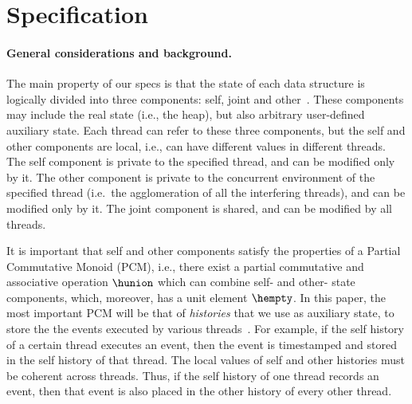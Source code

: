 \section{Specification}
\label{sc:formal}


\def\histx{\hist_\x}
\def\histy{\hist_\y}
\def\histp{\hist_p}

\newcommand{\sx}{S_\x}
\newcommand{\sy}{S_\y}
\newcommand{\spp}{S_p}
\newcommand{\sss}{S_s}
\newcommand{\wx}{W_\x}
\newcommand{\wy}{W_\y}
\newcommand{\wpp}{W_p}


\def\toff{t_{\mathsf{off}}}




\paragraph*{General considerations and background.}
%
The main property of our specs is that the state of each data
structure is logically divided into three components: self, joint and
other~\cite{LeyWildN+POPL13,NanevskiLSD+ESOP14,OPLSS:Notes}. These
components may include the real state (i.e., the heap), but also
arbitrary user-defined auxiliary state. Each thread can refer to these
three components, but the self and other components are local, i.e.,
can have different values in different threads.  The self component is
private to the specified thread, and can be modified only by it. The
other component is private to the concurrent environment of the
specified thread (i.e.~the agglomeration of all the interfering
threads), and can be modified only by it. The joint component is
shared, and can be modified by all threads.

It is important that self and other components satisfy the properties
of a Partial Commutative Monoid (PCM), i.e., there exist a partial
commutative and associative operation $\hunion$ which can combine
self- and other- state components, which, moreover, has a unit element
$\hempty$. In this paper, the most important PCM will be that of
\emph{histories} that we use as auxiliary state, to store the the
events executed by various threads~\cite{SergeyNB+ESOP15}. For
example, if the self history of a certain thread executes an event, then the event is
timestamped and stored in the self history of that thread. The local
values of self and other histories must be coherent across
threads. Thus, if the self history of one thread records an event,
then that event is also placed in the other history of every other
thread.

